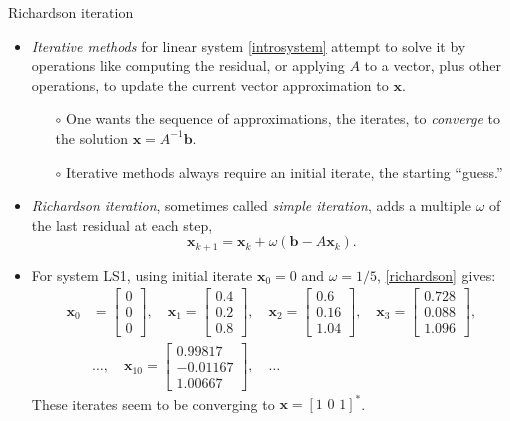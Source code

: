 \documentclass[10pt,hyperref]{beamer}
\newcommand{\bb}{\mathbf{b}}
\newcommand{\bx}{\mathbf{x}}
\begin{document}
\begin{frame}{Richardson iteration}

\begin{itemize}
\item \emph{Iterative methods} for linear system \eqref{introsystem} attempt to solve it by operations like computing the residual, or applying $A$ to a vector, plus other operations, to update the current vector approximation to $\bx$.
  \begin{itemize}
  \item[$\circ$] One wants the sequence of approximations, the iterates, to \emph{converge} to the solution $\bx = A^{-1} \bb$.
  \item[$\circ$] Iterative methods always require an initial iterate, the starting ``guess.''
  \end{itemize}
\item \emph{Richardson iteration}, sometimes called \emph{simple iteration}, adds a multiple $\omega$ of the last residual at each step,
\begin{equation}
\bx_{k+1} = \bx_k + \omega (\bb - A \bx_k).  \label{richardson}
\end{equation}
\item For system LS1, using initial iterate $\bx_0=0$ and $\omega=1/5$, \eqref{richardson} gives:\small
\begin{align*}
\bx_0 &= \begin{bmatrix} 0 \\ 0 \\ 0 \end{bmatrix}, \quad
\bx_1 = \begin{bmatrix} 0.4 \\ 0.2 \\ 0.8 \end{bmatrix}, \quad
\bx_2 = \begin{bmatrix} 0.6 \\ 0.16 \\ 1.04 \end{bmatrix}, \quad
\bx_3 = \begin{bmatrix} 0.728 \\ 0.088 \\ 1.096 \end{bmatrix}, \\
&\dots, \quad
\bx_{10} = \begin{bmatrix} 0.99817 \\ -0.01167 \\ 1.00667 \end{bmatrix}, \quad
\dots
\end{align*}
These iterates seem to be converging to $\bx = [1 \,\, 0 \,\, 1]^*$.
\end{itemize}
\end{frame}
\end{document}
